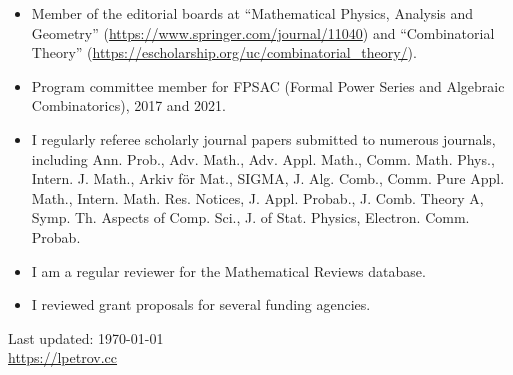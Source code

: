 \documentclass[letterpaper,11pt]{article}
\def\footerlink{https://lpetrov.cc}
\begin{document}
\begin{itemize}
	\item
	Member of the editorial boards at ``Mathematical Physics, Analysis and Geometry'' (\url{https://www.springer.com/journal/11040}) and ``Combinatorial Theory'' (\url{https://escholarship.org/uc/combinatorial_theory/}).
	\item Program committee member for FPSAC (Formal Power Series and Algebraic Combinatorics),
		2017 and 2021.
	\item 
	I regularly referee scholarly journal papers submitted to numerous journals, 
	including
	Ann. Prob., Adv. Math., Adv. Appl. Math., Comm. Math. Phys., Intern. J. Math.,
	Arkiv f\"or Mat., SIGMA, J. Alg. Comb., Comm. Pure Appl. Math., Intern. Math.
	Res. Notices, J. Appl. Probab., J. Comb. Theory A, Symp. Th. Aspects of Comp.
	Sci., J. of Stat. Physics, Electron. Comm. Probab. 
	\item
	I am a regular
	reviewer for the Mathematical Reviews database. 
	\item
	I reviewed grant proposals for several funding agencies.
\end{itemize}


\bigskip

\begin{center}
	\begin{footnotesize}
		Last updated: \today \\ \href{\footerlink}{\url{\footerlink}}
	\end{footnotesize}
\end{center}
\end{document}
